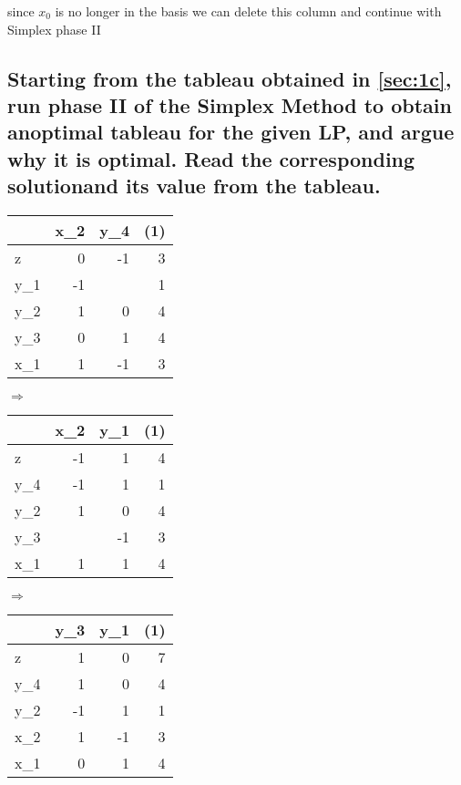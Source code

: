 \documentclass[12pt, a4]{article}
\begin{document}
since $x_0$ is no longer in the basis we can delete this column and continue with Simplex phase II

\subsection{Starting from the tableau obtained in \ref{sec:1c}, run phase II of the Simplex Method to obtain anoptimal tableau for the given LP, and argue why it is optimal. Read the corresponding solutionand its value from the tableau.}{\label{sec:1d}}

\begin{minipage}{.3\textwidth}
	\centering
	\begin{tabular}{L|RR||R}
		&  x_2 & y_4 & (1)  \\
		\hline
		z &  0 & -1 & 3 \\
		\hline
		y_1 &-1 &  & 1 \\
		y_2 & 1 & 0 & 4 \\
		y_3 & 0 & 1 & 4 \\
		x_1 & 1 &-1 & 3 \\
	\end{tabular}
\end{minipage}
$\Rightarrow$
\begin{minipage}{.3\textwidth}
	\centering
	\begin{tabular}{L|RR||R}
		&  x_2 & y_1 & (1)  \\
		\hline
		z &  -1 & 1 & 4 \\
		\hline
		y_4 &-1 & 1 & 1 \\
		y_2 & 1 & 0 & 4 \\
		y_3 &  &-1 & 3 \\
		x_1 & 1 & 1 & 4 \\
	\end{tabular}
\end{minipage}
$\Rightarrow$
\begin{minipage}{.3\textwidth}
	\centering
	\begin{tabular}{L|RR||R}
		&  y_3 & y_1 & (1)  \\
		\hline
		z   & 1 & 0 & 7 \\
		\hline
		y_4 & 1 & 0 & 4 \\
		y_2 &-1 & 1 & 1 \\
		x_2 & 1 &-1 & 3 \\
		x_1 & 0 & 1 & 4 \\
	\end{tabular}
\end{minipage}
\end{document}
